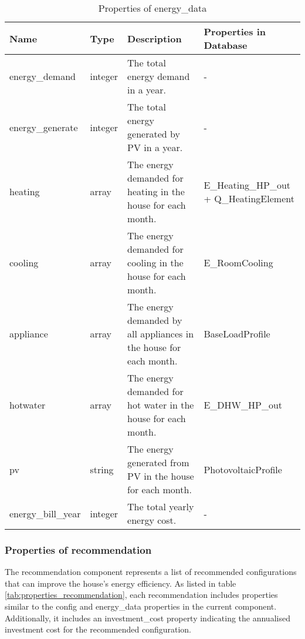 \begin{table}[h!]
    \centering
    \scriptsize
    \begin{tabular}{ | p{} | p{} | p{} | p{} | } 
    \hline
    Name & Type & Description & Properties in Database \\
    \hline
    energy\_demand & integer & The total energy demand in a year. & - \\
    \hline
    energy\_generate & integer & The total energy generated by PV in a year. & - \\
    \hline
    heating & array & The energy demanded for heating in the house for each month. & E\_Heating\_HP\_out + Q\_HeatingElement \\
    \hline
    cooling & array & The energy demanded for cooling in the house for each month. & E\_RoomCooling \\
    \hline
    appliance & array & The energy demanded by all appliances in the house for each month. & BaseLoadProfile \\
    \hline
    hotwater & array & The energy demanded for hot water in the house for each month. & E\_DHW\_HP\_out \\
    \hline
    pv & string & The energy generated from PV in the house for each month. & PhotovoltaicProfile \\
    \hline
    energy\_bill\_year & integer & The total yearly energy cost. & - \\
    \hline
    \end{tabular}
    \caption{Properties of energy\_data}
    \label{tab:properties_energydata}
\end{table}


\subsubsection{Properties of recommendation}

The recommendation component represents a list of recommended configurations that can improve the house's energy efficiency. 
As listed in table \ref{tab:properties_recommendation}, each recommendation includes properties similar to the config and energy\_data properties in the current component. 
Additionally, it includes an investment\_cost property indicating the annualised investment cost for the recommended configuration. 

